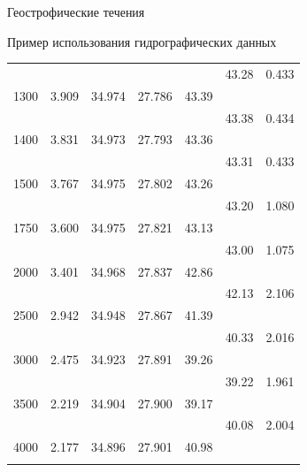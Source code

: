\begin{chapter}{Геострофические течения}
\begin{section}{Пример использования гидрографических данных}
\begin{table}[t!]
\begin{small}
\begin{center}
\begin{tabular}{rrrrrrl}
 &            &       &       &       &     43.28&  0.433\\
1300&   3.909&  34.974& 27.786& 43.39&\\
 &            &       &       &       &     43.38&  0.434\\
1400&   3.831&  34.973& 27.793& 43.36&\\
 &            &       &       &       &     43.31&  0.433\\
1500&   3.767&  34.975& 27.802& 43.26&\\
 &            &       &       &       &     43.20&  1.080\\
1750&   3.600&  34.975& 27.821& 43.13&\\
 &            &       &       &       &     43.00&  1.075\\
2000&   3.401&  34.968& 27.837& 42.86&\\
 &            &       &       &       &     42.13&  2.106\\
2500&   2.942&  34.948& 27.867& 41.39&\\
 &            &       &       &       &     40.33&  2.016\\
3000&   2.475&  34.923& 27.891& 39.26&\\
 &            &       &       &       &     39.22&  1.961\\
3500&   2.219&  34.904& 27.900& 39.17&\\
 &            &       &       &       &     40.08&  2.004\\
4000&   2.177&  34.896& 27.901& 40.98  \\
\rule[-1ex]{0mm}{1ex}&  \\
\hline
\end{tabular} \\
\end{center}
\end{small}
\end{table}


\end{section}
\end{chapter}
